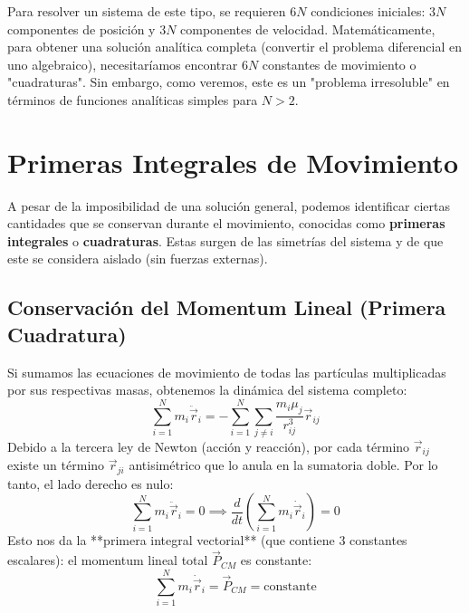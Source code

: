 \documentclass[a4paper]{article}
\begin{document}
Para resolver un sistema de este tipo, se requieren $6N$ condiciones iniciales: $3N$ componentes de posición y $3N$ componentes de velocidad. Matemáticamente, para obtener una solución analítica completa (convertir el problema diferencial en uno algebraico), necesitaríamos encontrar $6N$ constantes de movimiento o "cuadraturas". Sin embargo, como veremos, este es un "problema irresoluble" en términos de funciones analíticas simples para $N > 2$.

\section{Primeras Integrales de Movimiento}

A pesar de la imposibilidad de una solución general, podemos identificar ciertas cantidades que se conservan durante el movimiento, conocidas como \textbf{primeras integrales} o \textbf{cuadraturas}. Estas surgen de las simetrías del sistema y de que este se considera aislado (sin fuerzas externas).

\subsection{Conservación del Momentum Lineal (Primera Cuadratura)}
Si sumamos las ecuaciones de movimiento de todas las partículas multiplicadas por sus respectivas masas, obtenemos la dinámica del sistema completo:
\begin{equation}
    \sum_{i=1}^N m_i \ddot{\vec{r}}_i = -\sum_{i=1}^N \sum_{j \neq i} \frac{m_i \mu_j}{r_{ij}^3} \vec{r}_{ij}
\end{equation}
Debido a la tercera ley de Newton (acción y reacción), por cada término $\vec{r}_{ij}$ existe un término $\vec{r}_{ji}$ antisimétrico que lo anula en la sumatoria doble. Por lo tanto, el lado derecho es nulo:
\begin{equation}
    \sum_{i=1}^N m_i \ddot{\vec{r}}_i = 0 \implies \frac{d}{dt} \left( \sum_{i=1}^N m_i \dot{\vec{r}}_i \right) = 0
\end{equation}
Esto nos da la **primera integral vectorial** (que contiene 3 constantes escalares): el momentum lineal total $\vec{P}_{CM}$ es constante:
\begin{equation}
    \sum_{i=1}^N m_i \dot{\vec{r}}_i = \vec{P}_{CM} = \text{constante}
\end{equation}
\end{document}
